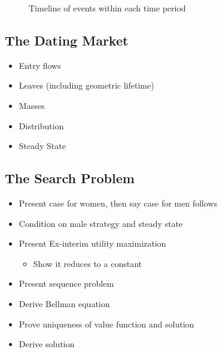 \begin{figure}[h]
    \centering
    \caption{Timeline of events within each time period} \label{fig:timeline}
\end{figure}    

\subsection{The Dating Market}
\begin{itemize}
    \item Entry flows
    \item Leaves (including geometric lifetime)
    \item Masses
    \item Distribution
    \item Steady State
\end{itemize}
\subsection{The Search Problem} 
\begin{itemize}
    \item Present case for women, then say case for men follows
    \item Condition on male strategy and steady state
    \item Present Ex-interim utility maximization
    \begin{itemize}
        \item Show it reduces to a constant
    \end{itemize} 
    \item Present sequence problem
    \item Derive Bellman equation
    \item Prove uniqueness of value function and solution
    \item Derive solution
\end{itemize}